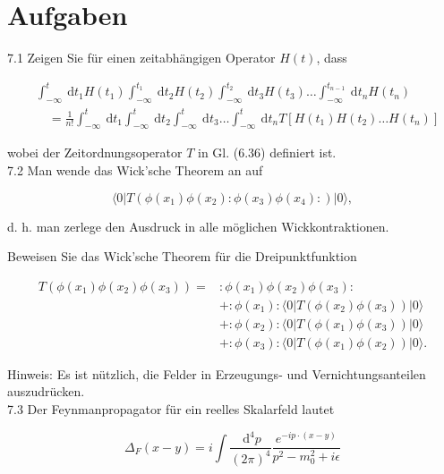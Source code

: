 \documentclass[10pt, letterpaper]{article}
\begin{document}
\section*{Aufgaben}
7.1 Zeigen Sie für einen zeitabhängigen Operator $H(t)$, dass

$$
\begin{aligned}
& \int_{-\infty}^{t} \mathrm{~d} t_{1} H\left(t_{1}\right) \int_{-\infty}^{t_{1}} \mathrm{~d} t_{2} H\left(t_{2}\right) \int_{-\infty}^{t_{2}} \mathrm{~d} t_{3} H\left(t_{3}\right) \ldots \int_{-\infty}^{t_{n-1}} \mathrm{~d} t_{n} H\left(t_{n}\right) \\
& \quad=\frac{1}{n!} \int_{-\infty}^{t} \mathrm{~d} t_{1} \int_{-\infty}^{t} \mathrm{~d} t_{2} \int_{-\infty}^{t} \mathrm{~d} t_{3} \ldots \int_{-\infty}^{t} \mathrm{~d} t_{n} T\left[H\left(t_{1}\right) H\left(t_{2}\right) \ldots H\left(t_{n}\right)\right]
\end{aligned}
$$

wobei der Zeitordnungsoperator $T$ in Gl. (6.36) definiert ist.\\
7.2 Man wende das Wick'sche Theorem an auf

$$
\langle 0| T\left(\phi\left(x_{1}\right) \phi\left(x_{2}\right): \phi\left(x_{3}\right) \phi\left(x_{4}\right):\right)|0\rangle,
$$

d. h. man zerlege den Ausdruck in alle möglichen Wickkontraktionen.

Beweisen Sie das Wick'sche Theorem für die Dreipunktfunktion

$$
\begin{aligned}
T\left(\phi\left(x_{1}\right) \phi\left(x_{2}\right) \phi\left(x_{3}\right)\right)= & : \phi\left(x_{1}\right) \phi\left(x_{2}\right) \phi\left(x_{3}\right): \\
& +: \phi\left(x_{1}\right):\langle 0| T\left(\phi\left(x_{2}\right) \phi\left(x_{3}\right)\right)|0\rangle \\
& +: \phi\left(x_{2}\right):\langle 0| T\left(\phi\left(x_{1}\right) \phi\left(x_{3}\right)\right)|0\rangle \\
& +: \phi\left(x_{3}\right):\langle 0| T\left(\phi\left(x_{1}\right) \phi\left(x_{2}\right)\right)|0\rangle .
\end{aligned}
$$

Hinweis: Es ist nützlich, die Felder in Erzeugungs- und Vernichtungsanteilen auszudrücken.\\
7.3 Der Feynmanpropagator für ein reelles Skalarfeld lautet

$$
\Delta_{F}(x-y)=i \int \frac{\mathrm{~d}^{4} p}{(2 \pi)^{4}} \frac{e^{-i p \cdot(x-y)}}{p^{2}-m_{0}^{2}+i \epsilon}
$$
\end{document}

